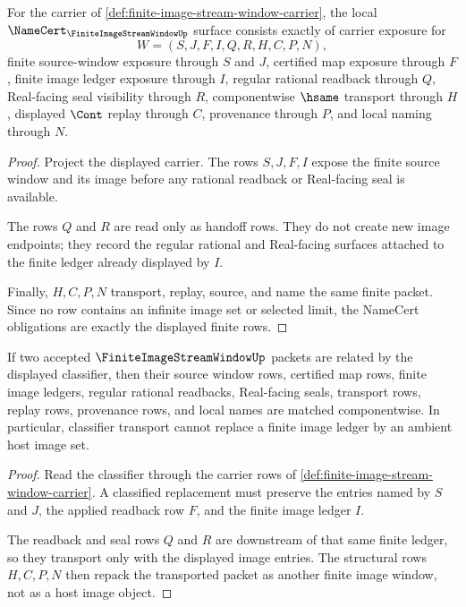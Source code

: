 \begin{theorem}
\label{thm:finite-image-stream-window-namecert-obligations}
For the carrier of \autoref{def:finite-image-stream-window-carrier}, the local $\NameCert_{\FiniteImageStreamWindowUp}$ surface consists exactly of carrier exposure for
$$
W=(S,J,F,I,Q,R,H,C,P,N),
$$
finite source-window exposure through $S$ and $J$, certified map exposure through $F$, finite image ledger exposure through $I$, regular rational readback through $Q$, Real-facing seal visibility through $R$, componentwise $\hsame$ transport through $H$, displayed $\Cont$ replay through $C$, provenance through $P$, and local naming through $N$.
\end{theorem}
\begin{proof}
Project the displayed carrier. The rows $S,J,F,I$ expose the finite source window and its image before any rational readback or Real-facing seal is available.

The rows $Q$ and $R$ are read only as handoff rows. They do not create new image endpoints; they record the regular rational and Real-facing surfaces attached to the finite ledger already displayed by $I$.

Finally, $H,C,P,N$ transport, replay, source, and name the same finite packet. Since no row contains an infinite image set or selected limit, the NameCert obligations are exactly the displayed finite rows.
\end{proof}

\begin{theorem}
\label{thm:finite-image-stream-window-classifier-stability}
If two accepted $\FiniteImageStreamWindowUp$ packets are related by the displayed classifier, then their source window rows, certified map rows, finite image ledgers, regular rational readbacks, Real-facing seals, transport rows, replay rows, provenance rows, and local names are matched componentwise. In particular, classifier transport cannot replace a finite image ledger by an ambient host image set.
\end{theorem}
\begin{proof}
Read the classifier through the carrier rows of \autoref{def:finite-image-stream-window-carrier}. A classified replacement must preserve the entries named by $S$ and $J$, the applied readback row $F$, and the finite image ledger $I$.

The readback and seal rows $Q$ and $R$ are downstream of that same finite ledger, so they transport only with the displayed image entries. The structural rows $H,C,P,N$ then repack the transported packet as another finite image window, not as a host image object.
\end{proof}

